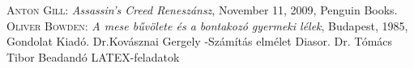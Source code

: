 \documentclass[12pt, a4paper, twoside]{report}
\theoremstyle{definition}
\theoremstyle{remark}
\begin{document}


\begin{thebibliography}{4}
    \textsc{Anton Gill}: \emph{Assassin's Creed Reneszánsz}, November 11, 2009, 	Penguin Books.
    \textsc{Oliver Bowden}: \emph{A mese bűvölete és a bontakozó gyermeki lélek}, Budapest, 1985, Gondolat Kiadó.
     Dr.Kovásznai Gergely -Számítás elmélet Diasor.
	 Dr. Tómács Tibor Beadandó LATEX-feladatok
\end{thebibliography}
\end{document}
